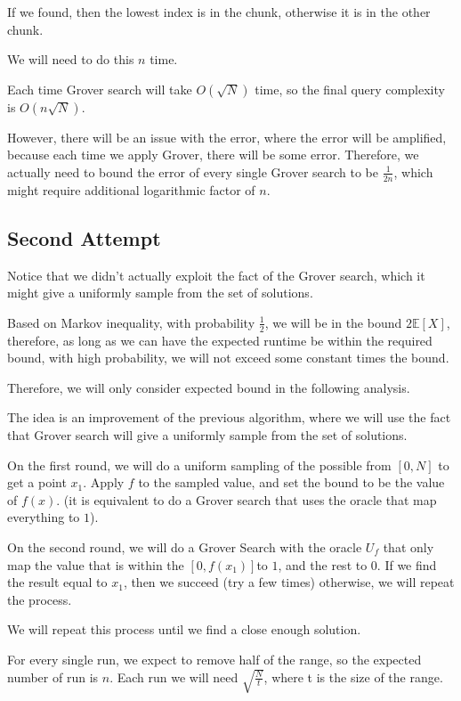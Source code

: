 \documentclass{article}
\theoremstyle{definition}
\begin{document}
If we found, then the lowest index is in the chunk, otherwise it is in the other chunk.

We will need to do this $n$ time.

Each time Grover search will take $O(\sqrt{N})$ time,
so the final query complexity is $O(n \sqrt{N})$.

However, there will be an issue with the error, where the error will be amplified,
because each time we apply Grover, there will be some error. Therefore, we actually
need to bound the error of every single Grover search to be \(\frac{1}{2n}\), which
might require additional logarithmic factor of \(n\).

\subsection*{Second Attempt}

Notice that we didn't actually exploit the fact of the Grover search,
which it might give a uniformly sample from the set of solutions.

Based on Markov inequality, with probability \(\frac{1}{2}\), we will be in the bound
\(2\mathbb{E} [X]\), therefore, as long as we can have the expected runtime be within
the required bound, with high probability, we will not exceed some constant times the bound.

Therefore, we will only consider expected bound in the following analysis.

The idea is an improvement of the previous algorithm, where we will use the fact that
Grover search will give a uniformly sample from the set of solutions.

On the first round, we will do a uniform sampling of the possible from \([0, N]\) to get a point \(x_1\).
Apply \(f\) to the sampled value, and set the bound to be the value of \(f(x)\).
(it is equivalent to do a Grover search that uses the oracle that map everything to \(1\)).

On the second round, we will do a Grover Search with the oracle \(U_f\) that only
map the value that is within the \([0, f(x_1)]\)to \(1\), and the rest to \(0\).
If we find the result equal to \(x_1\), then we succeed (try a few times)
otherwise, we will repeat the process.

We will repeat this process until we find a close enough solution.

For every single run, we expect to remove half of the range, so the expected number of run is \(n\).
Each run we will need \(\sqrt{\frac{N}{t}}\), where t is the size of the range.
\end{document}
